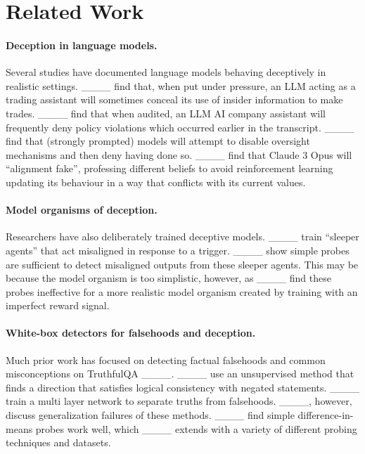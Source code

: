 \section{Related Work}
\label{related-work}

\paragraph{Deception in language models.}
Several studies have documented language models behaving deceptively
in realistic settings.
____ find that, when put under pressure, an LLM acting as a trading assistant will sometimes conceal its use of insider information to make trades.
____ find that when audited, an LLM AI company assistant will frequently deny policy violations which occurred earlier in the transcript.
____ find that (strongly prompted) models will attempt to disable oversight mechanisms and then deny having done so.
____ find that Claude 3 Opus will \enquote{alignment fake}, professing different beliefs to avoid reinforcement learning updating its behaviour in a way that conflicts with its current values.

\paragraph{Model organisms of deception.}
Researchers have also deliberately trained deceptive models.
____ train \enquote{sleeper agents} that act misaligned in response to a trigger.
____ show simple probes are sufficient to detect misaligned outputs from these sleeper agents. This may be because the model organism is too simplistic, however, as ____ find these probes ineffective for a more realistic model organism created by training with an imperfect reward signal.

\paragraph{White-box detectors for falsehoods and deception.} 
Much prior work has focused on detecting factual falsehoods and common misconceptions on TruthfulQA ____.
____ use an unsupervised method that finds a direction that satisfies logical consistency with negated statements. ____ train a multi layer network to separate truths from falsehoods.
____, however, discuss generalization failures of these methods.
____ find simple difference-in-means probes work well, which ____ extends with a variety of different probing techniques and datasets.

